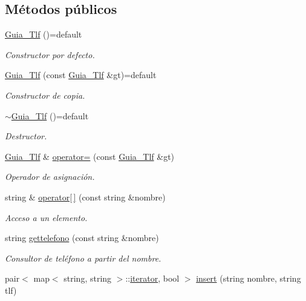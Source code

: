 \subsection*{Métodos públicos}
\begin{DoxyCompactItemize}
\item 
\hyperlink{classGuia__Tlf_af710ea22fb968c5e87a3694f62c6bb4d}{Guia\+\_\+\+Tlf} ()=default
\begin{DoxyCompactList}\small\item\em Constructor por defecto. \end{DoxyCompactList}\item 
\hyperlink{classGuia__Tlf_af5adb921ee6e321127a9bf0737f44ce3}{Guia\+\_\+\+Tlf} (const \hyperlink{classGuia__Tlf}{Guia\+\_\+\+Tlf} \&gt)=default
\begin{DoxyCompactList}\small\item\em Constructor de copia. \end{DoxyCompactList}\item 
\hyperlink{classGuia__Tlf_a07c35f4b0ca6d51079b700dbd28f9b7e}{$\sim$\+Guia\+\_\+\+Tlf} ()=default
\begin{DoxyCompactList}\small\item\em Destructor. \end{DoxyCompactList}\item 
\hyperlink{classGuia__Tlf}{Guia\+\_\+\+Tlf} \& \hyperlink{classGuia__Tlf_a12f2f749da1ccb349e63cd55437848dd}{operator=} (const \hyperlink{classGuia__Tlf}{Guia\+\_\+\+Tlf} \&gt)
\begin{DoxyCompactList}\small\item\em Operador de asignación. \end{DoxyCompactList}\item 
string \& \hyperlink{classGuia__Tlf_a6eed62abe5d13de96934e6897aaf9184}{operator\mbox{[}$\,$\mbox{]}} (const string \&nombre)
\begin{DoxyCompactList}\small\item\em Acceso a un elemento. \end{DoxyCompactList}\item 
string \hyperlink{classGuia__Tlf_a18593e3cf273db1a540cba69f87fd637}{gettelefono} (const string \&nombre)
\begin{DoxyCompactList}\small\item\em Consultor de teléfono a partir del nombre. \end{DoxyCompactList}\item 
pair$<$ map$<$ string, string $>$\+::\hyperlink{classGuia__Tlf_1_1iterator}{iterator}, bool $>$ \hyperlink{classGuia__Tlf_a8e712d6b87456d4cdb3c0c65adfb0262}{insert} (string nombre, string tlf)

\end{DoxyCompactItemize}
